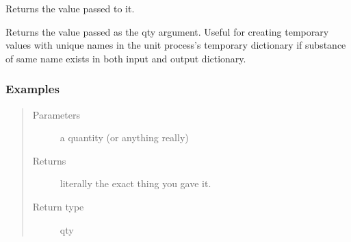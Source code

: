 \documentclass[a4paper,10pt,english]{sphinxmanual}
\begin{document}

\begin{fulllineitems}
\label{\detokenize{calculators:calculators.ReturnValue}}
Returns the value passed to it.

Returns the value passed as the qty argument. Useful for creating temporary
values with unique names in the unit process’s temporary dictionary if
substance of same name exists in both input and output dictionary.
\subsubsection*{Examples}

\begin{sphinxVerbatim}[commandchars=\\\{\}]
\end{sphinxVerbatim}
\begin{quote}\begin{description}
\item[{Parameters}] \leavevmode
{} \textendash{} a quantity (or anything really)

\item[{Returns}] \leavevmode
literally the exact thing you gave it.

\item[{Return type}] \leavevmode
qty

\end{description}\end{quote}

\end{fulllineitems}

\end{document}

